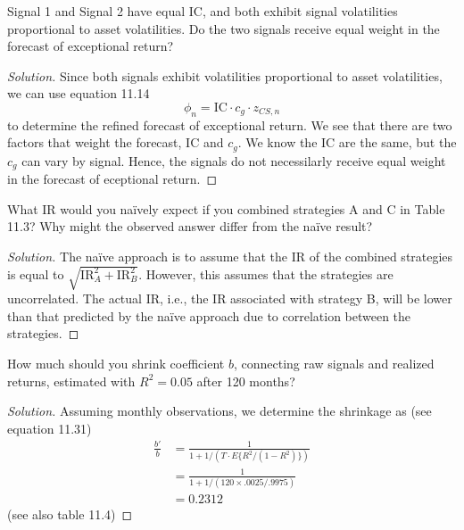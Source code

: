 \begin{problem}{11.1}
  Signal 1 and Signal 2 have equal IC, and both exhibit signal volatilities proportional to asset volatilities. Do the two signals receive equal weight in the forecast of exceptional return?
\end{problem}

\begin{proof}[Solution]
  Since both signals exhibit volatilities proportional to asset volatilities, we can use equation 11.14 
  \begin{equation*}
   \phi_{n}=\mathrm{IC}\cdot c_{g} \cdot z_{CS,n}
  \end{equation*}
  to determine the refined forecast of exceptional return. We see that there are two factors that weight the forecast, IC and $c_{g}$. We know the IC are the same, but the $c_{g}$ can vary by signal. Hence, the signals do not necessilarly receive equal weight in the forecast of eceptional return.
\end{proof}

\begin{problem}{11.2}
  What IR would you na\"{i}vely expect if you combined strategies A and C in Table 11.3? Why might the observed answer differ from the na\"{i}ve result?
\end{problem}

\begin{proof}[Solution]
  The na\"{i}ve approach is to assume that the IR of the combined strategies is equal to $\sqrt{\mathrm{IR}_{A}^{2}+\mathrm{IR}_{B}^{2}}$. However, this assumes that the strategies are uncorrelated. The actual IR, i.e., the IR associated with strategy B, will be lower than that predicted by the na\"{i}ve approach due to correlation between the strategies.
\end{proof}

\begin{problem}{11.3}
  How much should you shrink coefficient $b$, connecting raw signals and realized returns, estimated with $R^{2}=0.05$ after 120 months?
\end{problem}

\begin{proof}[Solution]
  Assuming monthly observations, we determine the shrinkage as (see equation 11.31)
  \begin{align*}
   \frac{b'}{b} &=\frac{1}{1+1/(T\cdot E\{R^{2}/(1-R^{2})\})}\\
		&=\frac{1}{1+1/(120 \times .0025/.9975)}\\
		&=0.2312
  \end{align*}
  (see also table 11.4)
\end{proof}